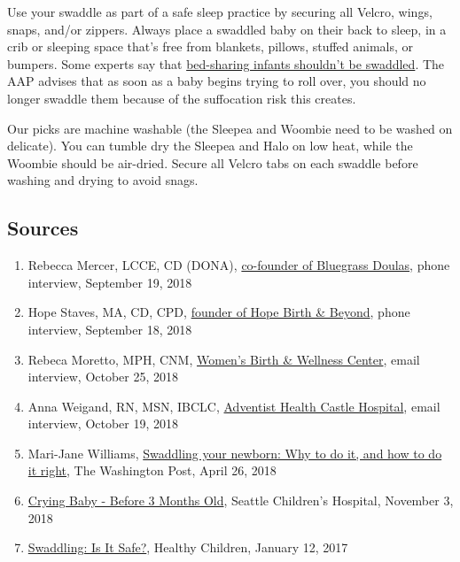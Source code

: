 Use your swaddle as part of a safe sleep practice by securing all
Velcro, wings, snaps, and/or zippers. Always place a swaddled baby on
their back to sleep, in a crib or sleeping space that's free from
blankets, pillows, stuffed animals, or bumpers. Some experts say that
\href{https://kellymom.com/parenting/nighttime/cosleeping/}{bed-sharing
infants shouldn't be swaddled}. The AAP advises that as soon as a baby
begins trying to roll over, you should no longer swaddle them because of
the suffocation risk this creates.

Our picks are machine washable (the Sleepea and Woombie need to be
washed on delicate). You can tumble dry the Sleepea and Halo on low
heat, while the Woombie should be air-dried. Secure all Velcro tabs on
each swaddle before washing and drying to avoid snags.

\hypertarget{sources}{%
\subsection{Sources}\label{sources}}

\begin{enumerate}
\def\labelenumi{\arabic{enumi}.}
\item
  Rebecca Mercer, LCCE, CD (DONA),
  \href{https://www.bluegrassdoulas.com/about}{co-founder of Bluegrass
  Doulas}, phone interview, September 19, 2018
\item
  Hope Staves, MA, CD, CPD,
  \href{https://www.hopebirthandbeyond.com/about-us}{founder of Hope
  Birth \& Beyond}, phone interview, September 18, 2018
\item
  Rebeca Moretto, MPH, CNM,
  \href{https://ncbirthcenter.org/who-we-are/certified-nurse-midwives/}{Women's
  Birth \& Wellness Center}, email interview, October 25, 2018
\item
  Anna Weigand, RN, MSN, IBCLC,
  \href{https://www.linkedin.com/in/anna-weigand-msn-ibclc-b85a4a21/}{Adventist
  Health Castle Hospital}, email interview, October 19, 2018
\item
  Mari-Jane Williams,
  \href{https://www.washingtonpost.com/news/parenting/wp/2018/04/26/swaddling-your-newborn-why-to-do-it-and-how-to-do-it-right/?noredirect=on\&utm_term=.a9599ef29f7e}{Swaddling
  your newborn: Why to do it, and how to do it right}, The Washington
  Post, April 26, 2018
\item
  \href{https://www.seattlechildrens.org/conditions/a-z/crying-baby-before-3-months-old/}{Crying
  Baby - Before 3 Months Old}, Seattle Children's Hospital, November 3,
  2018
\item
  \href{https://www.healthychildren.org/English/ages-stages/baby/diapers-clothing/Pages/Swaddling-Is-it-Safe.aspx}{Swaddling:
  Is It Safe?}, Healthy Children, January 12, 2017
\end{enumerate}

